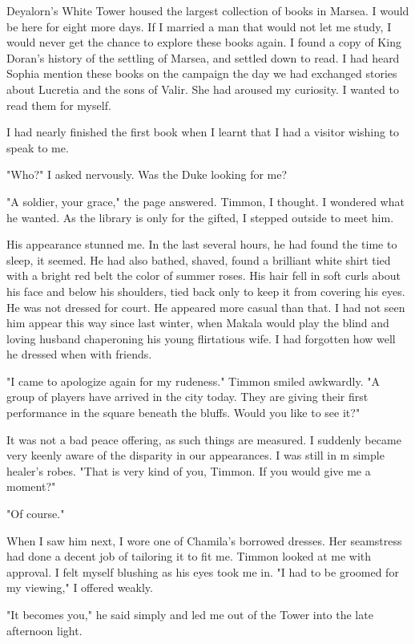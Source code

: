 \documentclass{article}
\begin{document}
Deyalorn's White Tower housed the largest collection of books in Marsea. I would be here for eight more days. If I married a man that would not let me study, I would never get the chance to explore these books again. I found a copy of King Doran's history of the settling of Marsea, and settled down to read. I had heard Sophia mention these books on the campaign the day we had exchanged stories about Lucretia and the sons of Valir. She had aroused my curiosity. I wanted to read them for myself. 

I had nearly finished the first book when I learnt that I had a visitor wishing to speak to me. 

"Who?" I asked nervously. Was the Duke looking for me?

"A soldier, your grace," the page answered. Timmon, I thought. I wondered what he wanted. As the library is only for the gifted, I stepped outside to meet him. 

His appearance stunned me. In the last several hours, he had found the time to sleep, it seemed. He had also bathed, shaved, found a brilliant white shirt tied with a bright red belt the color of summer roses. His hair fell in soft curls about his face and below his shoulders, tied back only to keep it from covering his eyes. He was not dressed for court. He appeared more casual than that. I had not seen him appear this way since last winter, when Makala would play the blind and loving husband chaperoning his young flirtatious wife. I had forgotten how well he dressed when with friends.

"I came to apologize again for my rudeness." Timmon smiled awkwardly. "A group of players have arrived in the city today. They are giving their first performance in the square beneath the bluffs. Would you like to see it?"

It was not a bad peace offering, as such things are measured. I suddenly became very keenly aware of the disparity in our appearances. I was still in m simple healer's robes. "That is very kind of you, Timmon. If you would give me a moment?"

"Of course."

When I saw him next, I wore one of Chamila's borrowed dresses. Her seamstress had done a decent job of tailoring it to fit me. Timmon looked at me with approval. I felt myself blushing as his eyes took me in. "I had to be groomed for my viewing," I offered weakly.

"It becomes you," he said simply and led me out of the Tower into the late afternoon light.
\end{document}
